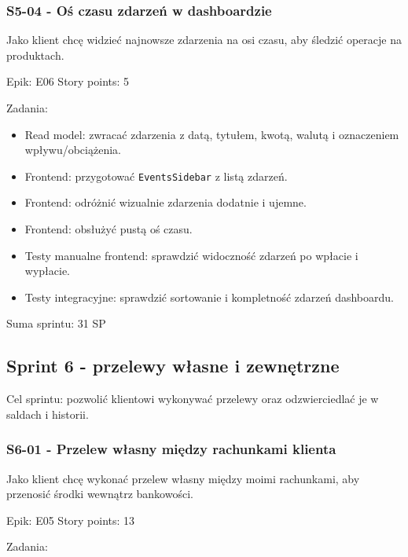 \documentclass[12pt,a4paper]{article}
\begin{document}
\subsubsection*{S5-04 - Oś czasu zdarzeń w dashboardzie}

Jako klient chcę widzieć najnowsze zdarzenia na osi czasu, aby śledzić operacje na produktach.

Epik: E06
Story points: 5

Zadania:

\begin{itemize}
\item Read model: zwracać zdarzenia z datą, tytułem, kwotą, walutą i oznaczeniem wpływu/obciążenia.
\item Frontend: przygotować \texttt{EventsSidebar} z listą zdarzeń.
\item Frontend: odróżnić wizualnie zdarzenia dodatnie i ujemne.
\item Frontend: obsłużyć pustą oś czasu.
\item Testy manualne frontend: sprawdzić widoczność zdarzeń po wpłacie i wypłacie.
\item Testy integracyjne: sprawdzić sortowanie i kompletność zdarzeń dashboardu.
\end{itemize}

Suma sprintu: 31 SP

\subsection*{Sprint 6 - przelewy własne i zewnętrzne}

Cel sprintu: pozwolić klientowi wykonywać przelewy oraz odzwierciedlać je w saldach i historii.

\subsubsection*{S6-01 - Przelew własny między rachunkami klienta}

Jako klient chcę wykonać przelew własny między moimi rachunkami, aby przenosić środki wewnątrz bankowości.

Epik: E05
Story points: 13

Zadania:
\end{document}
